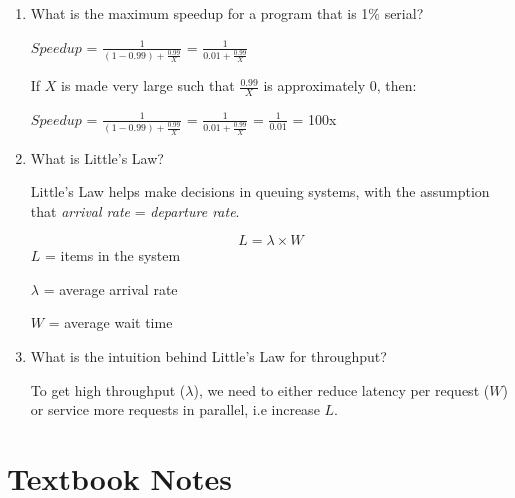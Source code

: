 \documentclass[12pt]{article}
\newenvironment{QandA}{\begin{enumerate}[label=\bfseries\arabic*.]\bfseries}
                      {\end{enumerate}}
\newenvironment{answered}{\par\quad\normalfont}{}
\begin{document}
\begin{QandA}
\begin{answered}
        $Speedup$ = $\frac{1}{(1-0.9) + \frac{0.9}{X}}$ = $\frac{1}{0.1 + \frac{0.9}{X}}$ = $\frac{1}{0.1}$ = 10x
        \end{answered}

    \item What is the maximum speedup for a program that is 1\% serial?
        \begin{answered}
        $Speedup$ = $\frac{1}{(1-0.99) + \frac{0.99}{X}}$ = $\frac{1}{0.01 + \frac{0.99}{X}}$
        
        If $X$ is made very large such that $\frac{0.99}{X}$ is approximately $0$, then:
        
        $Speedup$ = $\frac{1}{(1-0.99) + \frac{0.99}{X}}$ = $\frac{1}{0.01 + \frac{0.99}{X}}$ = $\frac{1}{0.01}$ = 100x
        \end{answered}
        
    \item What is Little's Law?
        \begin{answered}
        Little's Law helps make decisions in queuing systems, with the assumption that \textit{arrival rate} = \textit{departure rate}.
        
        \begin{equation}
            L = \lambda \times W
        \end{equation}
        $L$ = items in the system
        
        $\lambda$ = average arrival rate
        
        $W$ = average wait time 
        \end{answered}
    
    \item What is the intuition behind Little's Law for throughput?
        \begin{answered}
        To get high throughput ($\lambda$), we need to either reduce latency per request ($W$) or service more requests in parallel, i.e increase $L$.
        \end{answered}
\end{QandA}

\clearpage 

\section{Textbook Notes}
\end{document}
